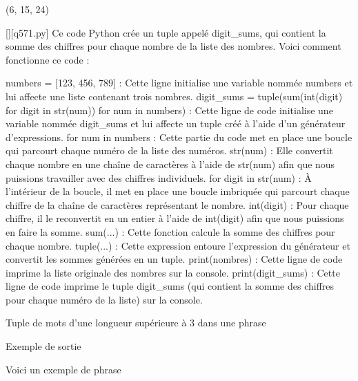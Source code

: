 (6, 15, 24)
        \par
        \begin{solution}
            \renewcommand{\nomfichier}{q571.py}
            \pythonfile{\chemincode \nomfichier}[][\nomfichier]
            Ce code Python crée un tuple appelé digit_sums, qui contient la somme des chiffres pour chaque nombre de la liste des nombres. Voici comment fonctionne ce code :

    numbers = [123, 456, 789] : Cette ligne initialise une variable nommée numbers et lui affecte une liste contenant trois nombres.
    digit_sums = tuple(sum(int(digit) for digit in str(num)) for num in numbers) : Cette ligne de code initialise une variable nommée digit_sums et lui affecte un tuple créé à l'aide d'un générateur d'expressions.
        for num in numbers : Cette partie du code met en place une boucle qui parcourt chaque numéro de la liste des numéros.
        str(num) : Elle convertit chaque nombre en une chaîne de caractères à l'aide de str(num) afin que nous puissions travailler avec des chiffres individuels.
        for digit in str(num) : À l'intérieur de la boucle, il met en place une boucle imbriquée qui parcourt chaque chiffre de la chaîne de caractères représentant le nombre.
        int(digit) : Pour chaque chiffre, il le reconvertit en un entier à l'aide de int(digit) afin que nous puissions en faire la somme.
        sum(...) : Cette fonction calcule la somme des chiffres pour chaque nombre.
        tuple(...) : Cette expression entoure l'expression du générateur et convertit les sommes générées en un tuple.
    print(nombres) : Cette ligne de code imprime la liste originale des nombres sur la console.
    print(digit_sums) : Cette ligne de code imprime le tuple digit_sums (qui contient la somme des chiffres pour chaque numéro de la liste) sur la console.
        \end{solution}
        

        \question
        Tuple de mots d'une longueur supérieure à 3 dans une phrase

Exemple de sortie

Voici un exemple de phrase

